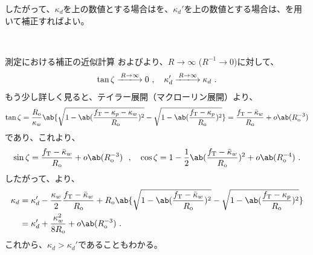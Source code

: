 したがって、$\kappa_d$を\Drawing 上の数値とする場合はを、$\kappa_d'$を\Drawing 上の数値とする場合は、を用いて補正すればよい。

\clearpage
~\vfill
\begin{\Columnname}{測定における\KeywayDepth 補正の近似計算}
およびより、$R\to\infty$ ($R^{-1}\to0$)に対して、
\begin{align*}
  \tan\zeta \xlongrightarrow{R\to\infty} 0~, \quad
  \kappa_d' \xlongrightarrow{R\to\infty} \kappa_d\ .
\end{align*}
もう少し詳しく見ると、テイラー展開（マクローリン展開）より、
\begin{align*}
  \tan\zeta
  = \frac{R_\mathrm o}{\kappa_w}
     \ab\{
     \sqrt{1-\ab(\frac{f_\mathrm T-\kappa_p-\kappa_w}{R_\mathrm o})^2}
     -\sqrt{1-\ab(\frac{f_\mathrm T-\kappa_p}{R_\mathrm o})^2}
     \}
  = \frac{f_\mathrm T-\bar\kappa_w}{R_\mathrm o}+o\ab(R_\mathrm o^{-3})
\end{align*}
であり、これより、
\begin{align*}
  \sin\zeta = \frac{f_\mathrm T-\bar\kappa_w}{R_\mathrm o}+o\ab(R_\mathrm o^{-3})~~, \quad
  \cos\zeta = 1-\frac12\ab(\frac{f_\mathrm T-\bar\kappa_w}{R_\mathrm o})^2
              +o\ab(R_\mathrm o^{-4})\ .
\end{align*}
したがって、より、
\begin{align*}
  \kappa_d
  &= \kappa_d'-\frac{\kappa_w}2\frac{f_\mathrm T-\bar\kappa_w}{R_\mathrm o}
     +R_\mathrm o
      \ab\{
      \sqrt{1-\ab(\frac{f_\mathrm T-\bar\kappa_w}{R_\mathrm o})^2}
      -\sqrt{1-\ab(\frac{f_\mathrm T-\kappa_p}{R_\mathrm o})^2}
      \}\\
  &= \kappa_d'+\frac{\kappa_w^2}{8R_\mathrm o}
     +o\ab(R_\mathrm o^{-3})\ .
\end{align*}
これから、$\kappa_d > \kappa_d'$であることもわかる。
\end{\Columnname}



